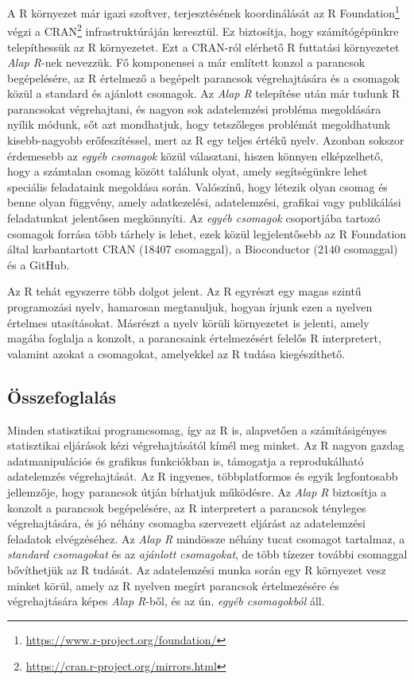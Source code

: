 \documentclass[
]{book}
\makeatletter
\DeclareRobustCommand{\href}[2]{#2\footnote{\url{#1}}}
\renewcommand{\href}[2]{#2\footnote{\url{#1}}}
\newenvironment{kframe}{%
\medskip{}
\setlength{\fboxsep}{.8em}
 \def\at@end@of@kframe{}%
 \ifinner\ifhmode%
  \def\at@end@of@kframe{\end{minipage}}%
  \begin{minipage}{\columnwidth}%
 \fi\fi%
 \def\FrameCommand##1{\hskip\@totalleftmargin \hskip-\fboxsep
 \colorbox{shadecolor}{##1}\hskip-\fboxsep
     \hskip-\linewidth \hskip-\@totalleftmargin \hskip\columnwidth}%
 \MakeFramed {\advance\hsize-\width
   \@totalleftmargin\z@ \linewidth\hsize
   \@setminipage}}%
 {\par\unskip\endMakeFramed%
 \at@end@of@kframe}
\newenvironment{rmdblock}[1]
  {
  \begin{itemize}
  \renewcommand{\labelitemi}{
    \raisebox{-.7\height}[0pt][0pt]{
      {\setkeys{Gin}{width=3em,keepaspectratio}\texttt{[image: images/\#1]}}
    }
  }
  \setlength{\fboxsep}{1em}
  \begin{kframe}
  \item
  }
  {
  \end{kframe}
  \end{itemize}
  }
\newenvironment{rmdsummary}
  {\begin{rmdblock}{summary}}
  {\end{rmdblock}}
\makeatother
\begin{document}
A R környezet már igazi szoftver, terjesztésének koordinálását az \href{https://www.r-project.org/foundation/}{R Foundation} végzi a \href{https://cran.r-project.org/mirrors.html}{CRAN} infrastruktúráján keresztül. Ez biztosítja, hogy számítógépünkre telepíthessük az R környezetet. Ezt a CRAN-ról elérhető R futtatási környezetet \emph{Alap R}-nek nevezzük. Fő komponensei a már említett konzol a parancsok begépelésére, az R értelmező a begépelt parancsok végrehajtására és a csomagok közül a standard és ajánlott csomagok. Az \emph{Alap R} telepítése után már tudunk R parancsokat végrehajtani, és nagyon sok adatelemzési probléma megoldására nyílik módunk, sőt azt mondhatjuk, hogy tetszőleges problémát megoldhatunk kisebb-nagyobb erőfeszítéssel, mert az R egy teljes értékű nyelv. Azonban sokszor érdemesebb az \emph{egyéb csomagok} közül választani, hiszen könnyen elképzelhető, hogy a számtalan csomag között találunk olyat, amely segítségünkre lehet speciális feladataink megoldása során. Valószínű, hogy létezik olyan csomag és benne olyan függvény, amely adatkezelési, adatelemzési, grafikai vagy publikálási feladatunkat jelentősen megkönnyíti. Az \emph{egyéb csomagok} csoportjába tartozó csomagok forrása több tárhely is lehet, ezek közül legjelentősebb az R Foundation által karbantartott CRAN (18407 csomaggal), a Bioconductor (2140 csomaggal) és a GitHub.

Az R tehát egyszerre több dolgot jelent. Az R egyrészt egy magas szintű programozási nyelv, hamarosan megtanuljuk, hogyan írjunk ezen a nyelven értelmes utasításokat. Másrészt a nyelv körüli környezetet is jelenti, amely magába foglalja a konzolt, a parancsaink értelmezésért felelős R interpretert, valamint azokat a csomagokat, amelyekkel az R tudása kiegészíthető.

\hypertarget{mi-az-r-1-summary}{%
\subsection{Összefoglalás}\label{mi-az-r-1-summary}}

\begin{rmdsummary}
Minden statisztikai programcsomag, így az R is, alapvetően a
számításigényes statisztikai eljárások kézi végrehajtásától kímél meg
minket. Az R nagyon gazdag adatmanipulációs és grafikus funkciókban is,
támogatja a reprodukálható adatelemzés végrehajtását. Az R ingyenes,
többplatformos és egyik legfontosabb jellemzője, hogy parancsok útján
bírhatjuk működésre. Az \emph{Alap R} biztosítja a konzolt a parancsok
begépelésére, az R interpretert a parancsok tényleges végrehajtására, és
jó néhány csomagba szervezett eljárást az adatelemzési feladatok
elvégzéséhez. Az \emph{Alap R} mindössze néhány tucat csomagot
tartalmaz, a \emph{standard csomagokat} és az \emph{ajánlott
csomagokat}, de több tízezer további csomaggal bővíthetjük az R tudását.
Az adatelemzési munka során egy R környezet vesz minket körül, amely az
R nyelven megírt parancsok értelmezésére és végrehajtására képes
\emph{Alap R}-ből, és az ún. \emph{egyéb csomagokból} áll.
\end{rmdsummary}
\end{document}
